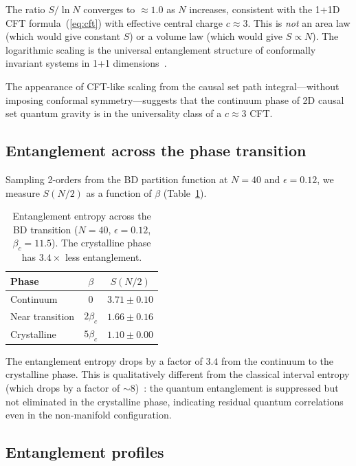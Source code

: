\documentclass[aps,prd,twocolumn,superscriptaddress,nofootinbib]{revtex4-2}
\begin{document}
The ratio $S/\ln N$ converges to $\approx 1.0$ as $N$ increases, consistent with the 1+1D CFT formula~(\ref{eq:cft}) with effective central charge $c \approx 3$. This is \emph{not} an area law (which would give constant $S$) or a volume law (which would give $S \propto N$). The logarithmic scaling is the universal entanglement structure of conformally invariant systems in 1+1 dimensions~\cite{calabrese2004}.

The appearance of CFT-like scaling from the causal set path integral---without imposing conformal symmetry---suggests that the continuum phase of 2D causal set quantum gravity is in the universality class of a $c \approx 3$ CFT.

\subsection{Entanglement across the phase transition}

Sampling 2-orders from the BD partition function at $N = 40$ and $\epsilon = 0.12$, we measure $S(N/2)$ as a function of $\beta$ (Table~\ref{tab:transition}).

\begin{table}[h]
\centering
\begin{tabular}{lcc}
\toprule
Phase & $\beta$ & $S(N/2)$ \\
\midrule
Continuum & 0 & $3.71 \pm 0.10$ \\
Near transition & $2\beta_c$ & $1.66 \pm 0.16$ \\
Crystalline & $5\beta_c$ & $1.10 \pm 0.00$ \\
\bottomrule
\end{tabular}
\caption{Entanglement entropy across the BD transition ($N = 40$, $\epsilon = 0.12$, $\beta_c = 11.5$). The crystalline phase has $3.4\times$ less entanglement.}
\label{tab:transition}
\end{table}

The entanglement entropy drops by a factor of $3.4$ from the continuum to the crystalline phase. This is qualitatively different from the classical interval entropy (which drops by a factor of $\sim$8)~\cite{loftus2026a}: the quantum entanglement is suppressed but not eliminated in the crystalline phase, indicating residual quantum correlations even in the non-manifold configuration.

\subsection{Entanglement profiles}
\end{document}
